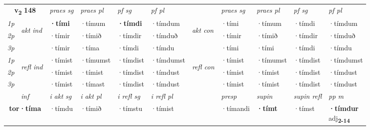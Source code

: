 \noindent
\begin{tabular}{lllllllllll} \toprule
\multicolumn{2}{c}{\textbf{v{\textsubscript{2}}} \Large{\textbf{148}}}  &  \textit{praes sg}  & \textit{praes pl}  &\textit{ pf sg} & \textit{pf pl} &  &  \textit{praes sg}  & \textit{praes pl}  & \textit{pf sg} & \textit{pf pl } \\*
	\cmidrule{3-6} \cmidrule{8-11}
 {\textit{1p}} & \multirow{3}{*}{\begin{turn}{90}\textit{akt ind}\end{turn}} & \textbf{·tími} & ·tímum & \textbf{·tímdi} & ·tímdum & \multirow{3}{*}{\begin{turn}{90}\textit{akt con}\end{turn}} &·tími & ·tímum & ·tímdi & ·tímdum\\*
 {\textit{2p}} &  &  ·tímir  & ·tímið & ·tímdir & ·tímduð & & ·tímir & ·tímið & ·tímdir & ·tímduð \\*
{\textit{3p}} &  & ·tímir & ·tíma & ·tímdi & ·tímdu & & ·tími & ·tími& ·tímdi & ·tímdu \\*
\cmidrule{3-6} \cmidrule{8-11}
 {\textit{1p}} & \multirow{3}{*}{\begin{turn}{90}\textit{refl ind}\end{turn}}  & ·tímist & ·tímumst & ·tímdist & ·tímdumst & \multirow{3}{*}{\begin{turn}{90}\textit{refl con}\end{turn}}  &·tímist & ·tímumst & ·tímdist & ·tímdumst \\*
 {\textit{2p}} &  & ·tímist & ·tímist & ·tímdist & ·tímdust & &·tímist & ·tímist & ·tímdist & ·tímdust \\*
 {\textit{3p}}  & & ·tímist & ·tímast & ·tímdist & ·tímdust & & ·tímist & ·tímist& ·tímdist & ·tímdust \\*
\cmidrule{3-6} \cmidrule{8-11}

   \multicolumn{2}{c}{\textit{inf}}  & \textit{i akt sg} & \textit{i akt pl} & \textit{i refl sg} & \textit{i refl pl} && \textit{presp} & \textit{supin} & \textit{supin refl} & \textit{pp m} \\*
  \multicolumn{2}{c}{\textbf{tor\allowbreak ·tíma}} & ·tímdu  & ·tímið & ·tímstu & ·tímist && ·tímandi &  \textbf{·tímt} & ·tímst & \specialcell{\textbf{·tímdur} \\ adj\textbf{\textsubscript{2-14}}} \\*
\end{tabular}

